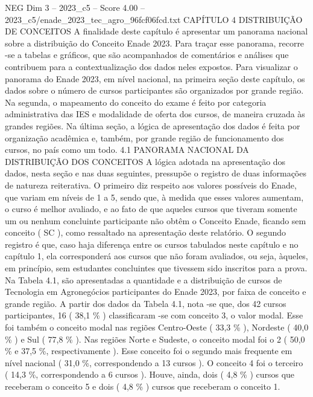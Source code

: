 \begin{textsample}{NEG Dim 3 – 2023\_c5 – Score 4.00 – 2023\_c5/enade\_2023\_tec\_agro\_96fcf06fcd.txt}  \label{ex:f3_neg_234}
CAPÍTULO 4 DISTRIBUIÇÃO DE CONCEITOS A finalidade deste capítulo é apresentar um panorama nacional sobre a distribuição do Conceito Enade 2023.
Para traçar esse panorama, recorre -se a tabelas e gráficos, que são acompanhados de comentários e análises que contribuem para a contextualização dos dados neles expostos.
Para visualizar o panorama do Enade 2023, em nível nacional, na primeira seção deste capítulo, os dados sobre o número de cursos participantes são organizados por grande região.
Na segunda, o mapeamento do conceito do exame é feito por categoria administrativa das IES e modalidade de oferta dos cursos, de maneira cruzada às grandes regiões.
Na última seção, a lógica de apresentação dos dados é feita por organização acadêmica e, também, por grande região de funcionamento dos cursos, no país como um todo. 4.1 PANORAMA NACIONAL DA DISTRIBUIÇÃO DOS CONCEITOS A lógica adotada na apresentação dos dados, nesta seção e nas duas seguintes, pressupõe o registro de duas informações de natureza reiterativa.
O primeiro diz respeito aos valores possíveis do Enade, que variam em níveis de 1 a 5, sendo que, à medida que esses valores aumentam, o curso é melhor avaliado, e ao fato de que aqueles cursos que tiveram somente um ou nenhum concluinte participante não obtêm o Conceito Enade, ficando sem conceito ( SC ), como ressaltado na apresentação deste relatório.
O segundo registro é que, caso haja diferença entre os cursos tabulados neste capítulo e no capítulo 1, ela corresponderá aos cursos que não foram avaliados, ou seja, àqueles, em princípio, sem estudantes concluintes que tivessem sido inscritos para a prova.
Na Tabela 4.1, são apresentadas a quantidade e a distribuição de cursos de Tecnologia em Agronegócios participantes do Enade 2023, por faixa de conceito e grande região.
A partir dos dados da Tabela 4.1, nota -se que, dos 42 cursos participantes, 16 ( 38,1 \% ) classificaram -se com conceito 3, o valor modal.
Esse foi também o conceito modal nas regiões Centro-Oeste ( 33,3 \% ), Nordeste ( 40,0 \% ) e Sul ( 77,8 \% ).
Nas regiões Norte e Sudeste, o conceito modal foi o 2 ( 50,0 \% e 37,5 \%, respectivamente ).
Esse conceito foi o segundo mais frequente em nível nacional ( 31,0 \%, correspondendo a 13 cursos ).
O conceito 4 foi o terceiro ( 14,3 \%, correspondendo a 6 cursos ).
Houve, ainda, dois ( 4,8 \% ) cursos que receberam o conceito 5 e dois ( 4,8 \% ) cursos que receberam o conceito 1.

\end{textsample}
